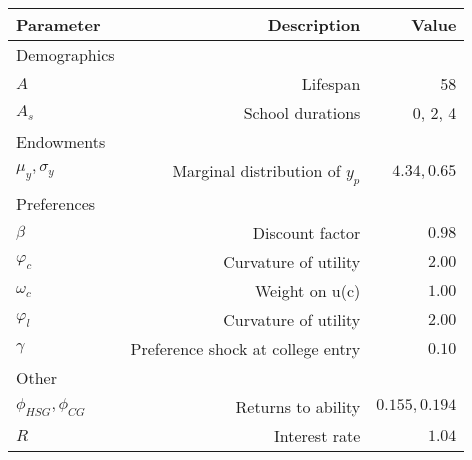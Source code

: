 \begin{tabular}{lrr}
\hline
Parameter & Description  & Value  \\ 
\hline
Demographics &   &   \\ 
$A$ & Lifespan  & 58  \\ 
$A_{s}$ & School durations  & 0, 2, 4  \\ 
Endowments &   &   \\ 
$\mu_{y}, \sigma_{y}$ & Marginal distribution of $y_{p}$  & $4.34, 0.65$  \\ 
Preferences &   &   \\ 
$\beta$ & Discount factor  & $0.98$  \\ 
$\varphi_{c}$ & Curvature of utility  & $2.00$  \\ 
$\omega_{c}$ & Weight on u(c)  & $1.00$  \\ 
$\varphi_{l}$ & Curvature of utility  & $2.00$  \\ 
$\gamma$ & Preference shock at college entry  & $0.10$  \\ 
Other &   &   \\ 
$\phi_{HSG}, \phi_{CG}$ & Returns to ability  & $0.155, 0.194$  \\ 
$R$ & Interest rate  & $1.04$  \\ 
\hline
\end{tabular}%
